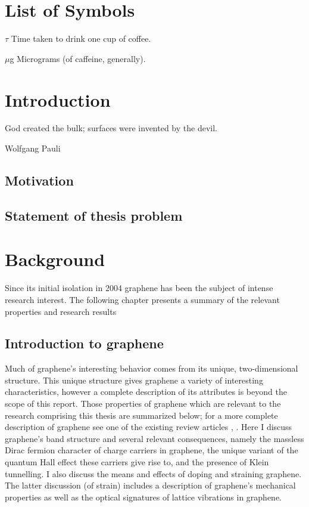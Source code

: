 \documentclass[edeposit,fullpage,draftthesis]{uiucthesis2009}
\begin{document}
\chapter{List of Symbols}

\begin{symbollist}[0.7in]
\item[$\tau$] Time taken to drink one cup of coffee.
\item[$\mu$g] Micrograms (of caffeine, generally).
\end{symbollist}

\mainmatter
\chapter{Introduction}

   \epigraph{God created the bulk; surfaces were invented by the devil.}{Wolfgang Pauli}
    

    \section{Motivation}
    \section{Statement of thesis problem}


\chapter{Background}

    Since its initial isolation in 2004 graphene has been the subject of intense research interest. 
    The following chapter presents a summary of the relevant properties and research results 

    \section{Introduction to graphene}

    Much of graphene's interesting behavior comes from its unique, two-dimensional structure. 
    This unique structure gives graphene a variety of interesting characteristics, however a complete 
    description of its attributes is beyond the scope of this report. Those properties of graphene 
    which are relevant to the research comprising this thesis are summarized below; for a more complete description 
    of graphene see one of the existing review articles \cite{Geim2007}, \cite{CastroNeto2009}. 
    Here I discuss graphene's band structure and several relevant consequences, namely 
    the massless Dirac fermion character of charge carriers in graphene, 
    the unique variant of the quantum Hall effect these carriers give rise to, 
    and the presence of Klein tunnelling.
    I also discuss the means and effects of doping and straining graphene. The latter discussion (of strain)
    includes a description of graphene's mechanical properties as well as the optical signatures of 
    lattice vibrations in graphene.
    
\end{document}
